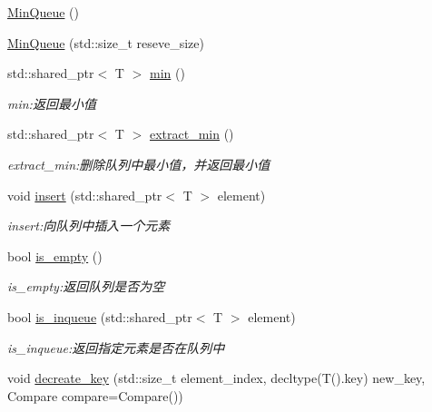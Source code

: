 \begin{DoxyCompactItemize}
\item 
\hyperlink{class_introduction_to_algorithm_1_1_queue_algorithm_1_1_min_queue_a86bf5a97695e09ab6fe255b68e72673d}{Min\+Queue} ()
\item 
\hyperlink{class_introduction_to_algorithm_1_1_queue_algorithm_1_1_min_queue_a8407e5922eceba5b30dfddc6bed309bd}{Min\+Queue} (std\+::size\+\_\+t reseve\+\_\+size)
\item 
std\+::shared\+\_\+ptr$<$ T $>$ \hyperlink{class_introduction_to_algorithm_1_1_queue_algorithm_1_1_min_queue_aafd66150ecbd81743c5204e8fd1b6e2b}{min} ()
\begin{DoxyCompactList}\small\item\em min\+:返回最小值 \end{DoxyCompactList}\item 
std\+::shared\+\_\+ptr$<$ T $>$ \hyperlink{class_introduction_to_algorithm_1_1_queue_algorithm_1_1_min_queue_ac040f9f8fe9a02d9e300e261708a3e6e}{extract\+\_\+min} ()
\begin{DoxyCompactList}\small\item\em extract\+\_\+min\+:删除队列中最小值，并返回最小值 \end{DoxyCompactList}\item 
void \hyperlink{class_introduction_to_algorithm_1_1_queue_algorithm_1_1_min_queue_af0e72003afbf634cd9f7df7f61de1c36}{insert} (std\+::shared\+\_\+ptr$<$ T $>$ element)
\begin{DoxyCompactList}\small\item\em insert\+:向队列中插入一个元素 \end{DoxyCompactList}\item 
bool \hyperlink{class_introduction_to_algorithm_1_1_queue_algorithm_1_1_min_queue_abc9cdc8881918001bf922c3b2cd64c1c}{is\+\_\+empty} ()
\begin{DoxyCompactList}\small\item\em is\+\_\+empty\+:返回队列是否为空 \end{DoxyCompactList}\item 
bool \hyperlink{class_introduction_to_algorithm_1_1_queue_algorithm_1_1_min_queue_a95ee21038ee245f37623eedbd273fb43}{is\+\_\+inqueue} (std\+::shared\+\_\+ptr$<$ T $>$ element)
\begin{DoxyCompactList}\small\item\em is\+\_\+inqueue\+:返回指定元素是否在队列中 \end{DoxyCompactList}\item 
void \hyperlink{class_introduction_to_algorithm_1_1_queue_algorithm_1_1_min_queue_a5f05999c02550096bf015a6e47a3ec7c}{decreate\+\_\+key} (std\+::size\+\_\+t element\+\_\+index, decltype(T().key) new\+\_\+key, Compare compare=Compare())

\end{DoxyCompactItemize}
